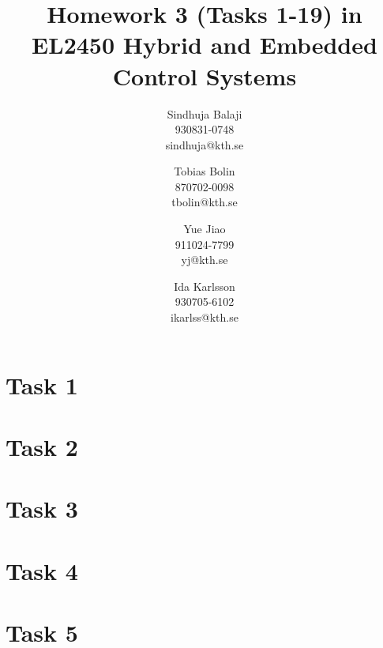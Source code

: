 \documentclass[a4paper,12pt,oneside,onecolumn]{article} %
\begin{document}

\title{Homework 3 (Tasks 1-19) in EL2450 Hybrid and Embedded Control Systems}
\author{
  Sindhuja Balaji \\ 930831-0748 \\ sindhuja@kth.se
  \and
  Tobias Bolin \\ 870702-0098 \\ tbolin@kth.se
  \and
  Yue Jiao \\ 911024-7799 \\ yj@kth.se
  \and
 Ida Karlsson \\ 930705-6102 \\ ikarlss@kth.se
  \and
  }

\maketitle                     %







\section*{Task 1}



\section*{Task 2}



\section*{Task 3}



\section*{Task 4}



\section*{Task 5}
\end{document}
